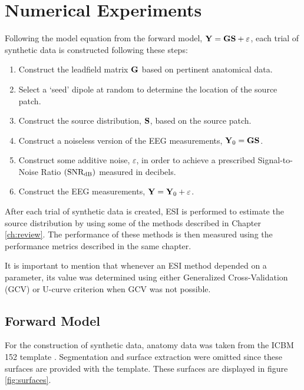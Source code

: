 \chapter{Numerical Experiments}
\label{ch:numeric}


Following the model equation from the forward model,
$\mathbf{Y} = \mathbf{G} \mathbf{S} + \varepsilon$,
each trial of synthetic data is constructed following these steps:
\begin{enumerate}
    \item Construct the leadfield matrix $\mathbf{G}$ based on pertinent anatomical data.
    \item Select a `seed' dipole at random to determine the location of the source patch.
    \item Construct the source distribution, $\mathbf{S}$, based on the source patch.
    \item Construct a noiseless version of the EEG measurements, $\mathbf{Y}_0 = \mathbf{G} \mathbf{S}$.
    \item Construct some additive noise, $\varepsilon$, in order to achieve a prescribed Signal-to-Noise Ratio $\left( \text{SNR}_\text{dB} \right)$ measured in decibels.
    \item Construct the EEG measurements, $\mathbf{Y} = \mathbf{Y}_0 + \varepsilon$.
\end{enumerate}

After each trial of synthetic data is created, ESI is performed to estimate the source distribution by using some of the methods described in Chapter \ref{ch:review}.
%
The performance of these methods is then measured using the performance metrics described in the same chapter.

It is important to mention that whenever an ESI method depended on a parameter, its value was determined using either Generalized Cross-Validation (GCV) or U-curve criterion when GCV was not possible.

\section{Forward Model}

For the construction of synthetic data, anatomy data was taken from the ICBM 152 template \cite{icbm152_2011}. 
%
%
Segmentation and surface extraction were omitted since these surfaces are provided with the template.
%
These surfaces are displayed in figure \ref{fig:surfaces}.

